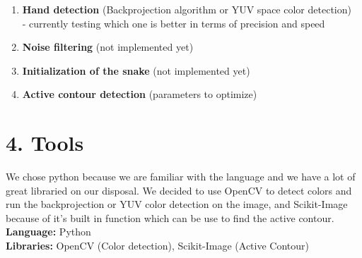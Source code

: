 \documentclass{report}
\begin{document}
\begin{enumerate}

\item \textbf{Hand detection} (Backprojection algorithm or YUV space color detection)\\- currently testing which one is better in terms of precision and speed

\item \textbf{Noise filtering} (not implemented yet)

\item \textbf{Initialization of the snake} (not implemented yet)

\item \textbf{Active contour detection} (parameters to optimize)

\end{enumerate}

\section*{4. Tools}

We chose python because we are familiar with the language and we have a lot of great libraried on our disposal. We decided to use OpenCV to detect colors and run the backprojection or YUV color detection on the image, and Scikit-Image because of it's built in function which can be use to find the active contour. \\

\textbf{Language:} Python\\

\textbf{Libraries:} OpenCV (Color detection), Scikit-Image (Active Contour)\\
\end{document}

